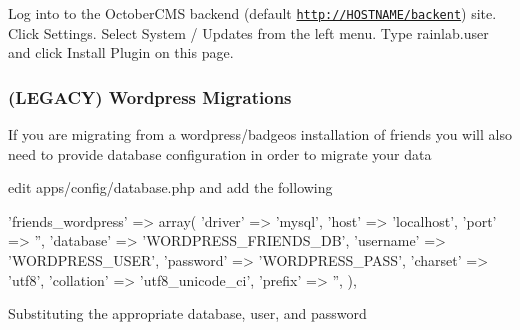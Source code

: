 Log into to the October\+C\+M\+S backend (default \href{http://HOSTNAME/backent}{\tt http\+://\+H\+O\+S\+T\+N\+A\+M\+E/backent}) site. Click Settings. Select System / Updates from the left menu. Type rainlab.\+user and click Install Plugin on this page.

\subsubsection*{(L\+E\+G\+A\+C\+Y) Wordpress Migrations}

If you are migrating from a wordpress/badgeos installation of friends you will also need to provide database configuration in order to migrate your data


\begin{DoxyItemize}
\item edit apps/config/database.\+php and add the following 
\begin{DoxyPre}
        'friends\_wordpress' => array(
            'driver'    => 'mysql',
            'host'      => 'localhost',
            'port'      => '', 
            'database'  => 'WORDPRESS\_FRIENDS\_DB',
            'username'  => 'WORDPRESS\_USER',
            'password'  => 'WORDPRESS\_PASS',
            'charset'   => 'utf8',
            'collation' => 'utf8\_unicode\_ci',
            'prefix'    => '', 
        ), 
\end{DoxyPre}
 Substituting the appropriate database, user, and password 
\end{DoxyItemize}